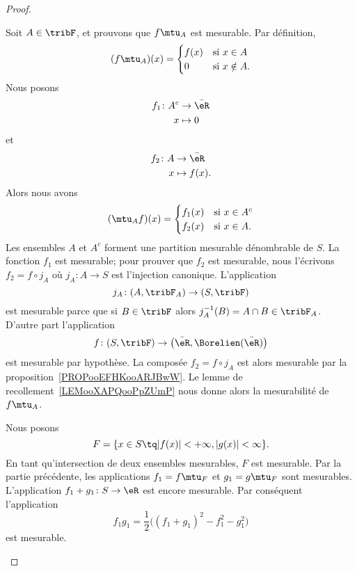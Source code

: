 \begin{proof}
\begin{subproof}
\begin{subproof}
			Soit \( A\in \tribF\), et prouvons que \( f\mtu_A\) est mesurable. Par définition,
			\begin{equation}
				(f\mtu_A)(x)=\begin{cases}
					f(x) & \text{si } x\in A     \\
					0    & \text{si } x\notin A.
				\end{cases}
			\end{equation}
			Nous posons \begin{equation}
				\begin{aligned}
					f_1\colon A^c & \to \bar \eR \\
					x             & \mapsto 0
				\end{aligned}
			\end{equation}
			et
			\begin{equation}
				\begin{aligned}
					f_2\colon A & \to \bar \eR  \\
					x           & \mapsto f(x).
				\end{aligned}
			\end{equation}
			Alors nous avons
			\begin{equation}
				(\mtu_Af)(x)=\begin{cases}
					f_1(x) & \text{si } x\in A^c \\
					f_2(x) & \text{si } x\in  A.
				\end{cases}
			\end{equation}
			Les ensembles \( A\) et \( A^c\) forment une partition mesurable dénombrable de \( S\). La fonction \( f_1\) est mesurable; pour prouver que \( f_2\) est mesurable, nous l'écrivons \( f_2=f\circ j_A\) où \( j_A\colon A\to S\) est l'injection canonique. L'application
			\begin{equation}
				j_A\colon (A,\tribF_A)\to (S,\tribF)
			\end{equation}
			est mesurable parce que si \( B\in\tribF\) alors \( j_A^{-1}(B)=A\cap B\in\tribF_A\). D'autre part l'application
			\begin{equation}
				f\colon (S,\tribF)\to \big( \bar \eR,\Borelien(\bar \eR) \big)
			\end{equation}
			est mesurable par hypothèse. La composée \( f_2=f\circ j_A\) est alors mesurable par la proposition~\ref{PROPooEFHKooARJBwW}. Le lemme de recollement~\ref{LEMooXAPQooPpZUmP} nous donne alors la mesurabilité de \( f\mtu_A\).

			Nous posons
			\begin{equation}
				F=\{ x\in S\tq | f(x) |<+\infty,| g(x) |<\infty \}.
			\end{equation}
			En tant qu'intersection de deux ensembles mesurables, \( F\) est mesurable. Par la partie précédente, les applications \( f_1=f\mtu_F\) et \( g_1=g\mtu_F\) sont mesurables. L'application \( f_1+g_1\colon S\to \eR\) est encore mesurable. Par conséquent l'application
			\begin{equation}
				f_1g_1=\frac{ 1 }{2}\big( (f_1+g_1)^2-f_1^2-g_1^2 \big)
			\end{equation}
			est mesurable.


\end{subproof}
\end{subproof}
\end{proof}
